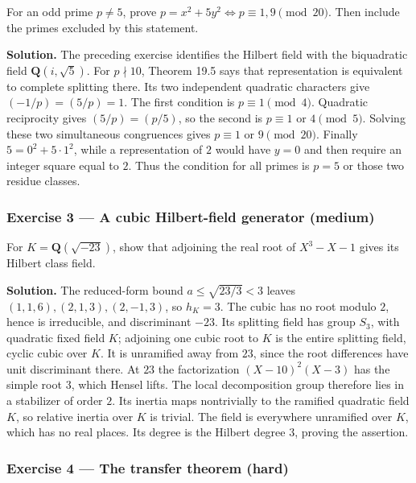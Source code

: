 \documentclass[11pt,a4paper]{article}
\begin{document}
For an odd prime \(p\ne5\), prove
\(p=x^2+5y^2\Longleftrightarrow p\equiv1,9\pmod{20}\). Then include the
primes excluded by this statement.

\textbf{Solution.} The preceding exercise identifies the Hilbert field
with the biquadratic field \(\mathbf Q(i,\sqrt5)\). For \(p\nmid10\),
Theorem 19.5 says that representation is equivalent to complete
splitting there. Its two independent quadratic characters give
\((-1/p)=(5/p)=1\). The first condition is \(p\equiv1\pmod4\). Quadratic
reciprocity gives \((5/p)=(p/5)\), so the second is \(p\equiv1\) or
\(4\pmod5\). Solving these two simultaneous congruences gives
\(p\equiv1\) or \(9\pmod{20}\). Finally \(5=0^2+5\cdot1^2\), while a
representation of \(2\) would have \(y=0\) and then require an integer
square equal to \(2\). Thus the condition for all primes is \(p=5\) or
those two residue classes.

\subsubsection{Exercise 3 --- A cubic Hilbert-field generator
(medium)}\label{exercise-3-a-cubic-hilbert-field-generator-medium}

For \(K=\mathbf Q(\sqrt{-23})\), show that adjoining the real root of
\(X^3-X-1\) gives its Hilbert class field.

\textbf{Solution.} The reduced-form bound \(a\leq\sqrt{23/3}<3\) leaves
\((1,1,6),(2,1,3),(2,-1,3)\), so \(h_K=3\). The cubic has no root modulo
\(2\), hence is irreducible, and discriminant \(-23\). Its splitting
field has group \(S_3\), with quadratic fixed field \(K\); adjoining one
cubic root to \(K\) is the entire splitting field, cyclic cubic over
\(K\). It is unramified away from \(23\), since the root differences
have unit discriminant there. At \(23\) the factorization
\((X-10)^2(X-3)\) has the simple root \(3\), which Hensel lifts. The
local decomposition group therefore lies in a stabilizer of order \(2\).
Its inertia maps nontrivially to the ramified quadratic field \(K\), so
relative inertia over \(K\) is trivial. The field is everywhere
unramified over \(K\), which has no real places. Its degree is the
Hilbert degree \(3\), proving the assertion.

\subsubsection{Exercise 4 --- The transfer theorem
(hard)}\label{exercise-4-the-transfer-theorem-hard}
\end{document}
